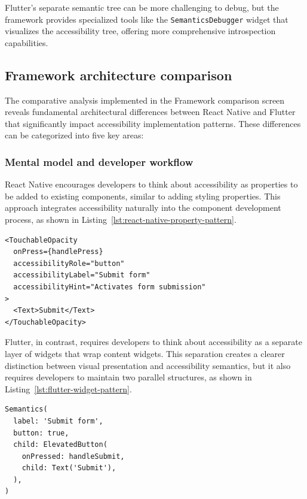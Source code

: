 Flutter's separate semantic tree can be more challenging to debug, but the framework provides specialized tools like the \texttt{SemanticsDebugger} widget that visualizes the accessibility tree, offering more comprehensive introspection capabilities.
\subsection{Framework architecture comparison}

The comparative analysis implemented in the Framework comparison screen reveals fundamental architectural differences between React Native and Flutter that significantly impact accessibility implementation patterns. These differences can be categorized into five key areas:

\subsubsection{Mental model and developer workflow}

React Native encourages developers to think about accessibility as properties to be added to existing components, similar to adding styling properties. This approach integrates accessibility naturally into the component development process, as shown in Listing~\ref{lst:react-native-property-pattern}.

\begin{lstlisting}[style=ReactNativeStyle, caption=Property-based accessibility pattern in React Native, label=lst:react-native-property-pattern]
<TouchableOpacity
  onPress={handlePress}
  accessibilityRole="button"
  accessibilityLabel="Submit form"
  accessibilityHint="Activates form submission"
>
  <Text>Submit</Text>
</TouchableOpacity>
\end{lstlisting}

\FloatBarrier

Flutter, in contrast, requires developers to think about accessibility as a separate layer of widgets that wrap content widgets. This separation creates a clearer distinction between visual presentation and accessibility semantics, but it also requires developers to maintain two parallel structures, as shown in Listing~\ref{lst:flutter-widget-pattern}.

\begin{lstlisting}[style=DartStyle, caption=Widget-based accessibility pattern in Flutter, label=lst:flutter-widget-pattern]
Semantics(
  label: 'Submit form',
  button: true,
  child: ElevatedButton(
    onPressed: handleSubmit,
    child: Text('Submit'),
  ),
)
\end{lstlisting}

